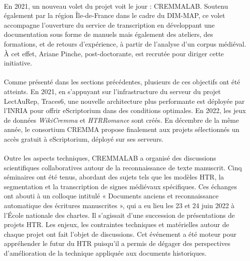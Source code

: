 \documentclass[a4paper,12pt,twoside]{book}
\begin{document}
\paragraph{}
En 2021, un nouveau volet du projet voit le jour : CREMMALAB. Soutenu également par la région Île-de-France dans le cadre du DIM-MAP, ce volet accompagne l'ouverture du service de transcription en développant une documentation sous forme de manuels mais également des ateliers, des formations, et de retours d’expérience, à partir de l’analyse d’un corpus médiéval. À cet effet, Ariane Pinche, post-doctorante, est recrutée pour diriger cette initiative.
	
\paragraph{}
Comme présenté dans les sections précédentes, plusieurs de ces objectifs ont été atteints. En 2021, en s'appuyant sur l'infrastructure du serveur du projet LectAuRep, Traces6, une nouvelle architecture plus performante est déployée par l'INRIA pour offrir eScriptorium dans des conditions optimales. En 2022, les jeux de données \textit{WikiCremma} et \textit{HTRRomance} sont créés. En décembre de la même année, le consortium CREMMA propose finalement aux projets sélectionnés un accès gratuit à eScriptorium, déployé sur ses serveurs.
	
\paragraph{}
Outre les aspects techniques, CREMMALAB a organisé des discussions scientifiques collaboratives autour de la reconnaissance de texte manuscrit. Cinq séminaires ont été tenus, abordant des sujets tels que les modèles HTR, la segmentation et la transcription de signes médiévaux spécifiques. Ces échanges ont abouti à un colloque intitulé « Documents anciens et reconnaissance automatique des écritures manuscrites », qui a eu lieu les 23 et 24 juin 2022 à l’École nationale des chartes. Il s'agissait d'une succession de présentations de projets HTR. Les enjeux, les contraintes techniques et matérielles autour de chaque projet ont fait l'objet de discussions. Cet événement a été moteur pour appréhender le futur du HTR puisqu'il a permis de dégager des perspectives d'amélioration de la technique appliquée aux documents historiques.  
\end{document}
